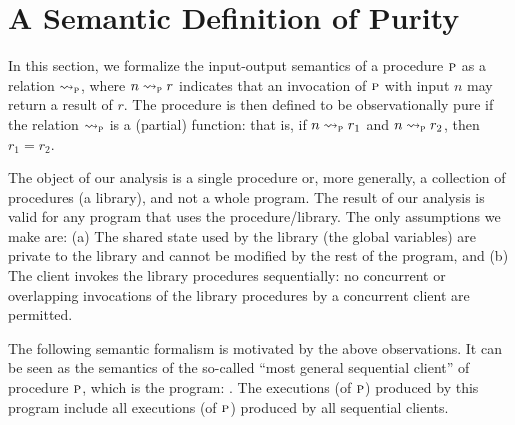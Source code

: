 
\newcommand{\vals}{\mathcal{V}}
\newcommand{\gvars}{G}
\newcommand{\lvars}{L}
\newcommand{\gmap}{\rho_g}
\newcommand{\gmaps}{\Sigma_G}
\newcommand{\lmap}{\rho_\ell}
\newcommand{\lmaps}{\Sigma_L}
\newcommand{\cstates}{\Sigma_C}
\newcommand{\cont}{c}
\newcommand{\lstack}{\gamma}
\newcommand{\initstate}{\sigma_{\text{init}}}

\newcommand{\initial}[1]{\textit{initial}(#1)}
\newcommand{\final}[1]{\textit{final}(#1)}
\newcommand{\inputval}[1]{\textit{input}(#1)}
\newcommand{\outputval}[1]{\textit{output}(#1)}

\newcommand{\extmap}{\sigma_e}


\newcommand{\iosem}[1]{\rightsquigarrow_{#1}}
\newcommand{\iosemP}{\iosem{\proc}}
\newcommand{\sssem}[1]{\rightarrow_{#1}}
\newcommand{\sssemP}{\sssem{\proc}}

\newcommand{\basicevalsto}[3]{ ({#1},{#2}) \Downarrow {#3}}
\newcommand{\evalsto}[4]{ ({#1} \uplus {#2},{#3}) \Downarrow {#4}}

\newcommand{\labrule}[3]{\inferrule*[Lab={[#1]}]{#2}{#3}}

\section{A Semantic Definition of Purity}

In this section, we formalize the input-output semantics of a procedure $\textsc{p}$ as a relation $\iosem{\proc}$,
where $n \iosem{\proc} r$ indicates that an invocation of $\textsc{p}$ with input $n$ may return a result of $r$.
The procedure is then defined to be observationally pure if the relation $\iosem{\proc}$ is a (partial) function:
that is, if  $n \iosem{\proc} r_1$ and $n \iosem{\proc} r_2$, then $r_1 = r_2$.

The object of our analysis is a single procedure or, more generally, a collection of procedures (a library),
and not a whole program. The result of our analysis is valid for any program that uses the procedure/library.
The only assumptions we make are: (a) The shared state used by the library (the global variables) are private
to the library and cannot be modified by the rest of the program, and (b) The client invokes the library
procedures sequentially: no concurrent or overlapping invocations of the library procedures by a concurrent
client are permitted.

The following semantic formalism is motivated by the above observations. It can be seen as the semantics
of the so-called ``most general sequential client'' of procedure $\textsc{p}$, which is the program:
.
The executions (of $\textsc{p}$) produced by this program include all executions (of $\textsc{p}$)  produced by all
sequential clients.

